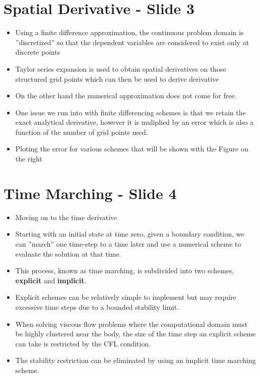 \documentclass[a4paper,17pt]{extarticle}
\begin{document}
\pagebreak \section*{Spatial Derivative - Slide 3}
\begin{itemize}
   \item Using a finite difference approximation, the continuous problem domain is ”discretized”
      so that the dependent variables are considered to exist only at discrete points
   \item Taylor series expansion is used to obtain spatial derivatives on those structured grid
      points which can then be used to derive derivative
   \item On the other hand the numerical approximation does not come for free.
   \item One issue we run into with finite differencing schemes is that we retain the exact
      analytical derivative, however it is muliplied by an error which is also a function of the 
      number of grid points used.
   \item Ploting the error for various schemes that will be shown with the Figure on the right
\end{itemize}

\pagebreak \section*{Time Marching - Slide 4}
\begin{itemize}
   \item  Moving on to the time derivative
   \item Starting with an initial state at time zero, given a boundary condition, we can 
         ”march” one time-step to a time later and use a numerical scheme to evaluate the 
         solution at that time.
   \item This process, known as time marching, is subdivided into two schemes, \textbf{explicit} and
      \textbf{implicit}.
   \item Explicit schemes can be relatively simple to implement but may require excessive 
         time steps due to a bounded stability limit.
   \item When solving viscous flow problems where the computational domain must be highly 
         clustered near the body, the size of the time step an explicit scheme can take is 
         restricted by the CFL condition. 
   \item The stability restriction can be eliminated by using an implicit time marching scheme.
\end{itemize}
\end{document}
